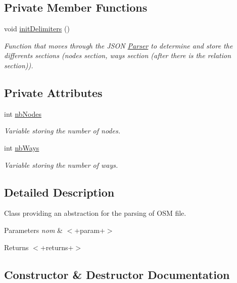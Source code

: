 \subsection*{Private Member Functions}
\begin{DoxyCompactItemize}
\item 
void \hyperlink{classParser_a43282c4f0874c45a64a6daf25cae6e31}{init\+Delimiters} ()
\begin{DoxyCompactList}\small\item\em Function that moves through the J\+S\+ON \hyperlink{classParser}{Parser} to determine and store the differents sections (nodes section, ways section (after there is the relation section)). \end{DoxyCompactList}\end{DoxyCompactItemize}
\subsection*{Private Attributes}
\begin{DoxyCompactItemize}
\item 
int \hyperlink{classParser_a0b9210ce3e141f6c36ee800e6301e477}{nb\+Nodes}
\begin{DoxyCompactList}\small\item\em Variable storing the number of nodes.\end{DoxyCompactList}\item 
int \hyperlink{classParser_a641ee642470f19ec1cb79b74f8c70288}{nb\+Ways}
\begin{DoxyCompactList}\small\item\em Variable storing the number of ways.\end{DoxyCompactList}\end{DoxyCompactItemize}


\subsection{Detailed Description}
Class providing an abstraction for the parsing of O\+SM file. 


\begin{DoxyParams}{Parameters}
{\em nom} & $<$+param+$>$\\
\hline
\end{DoxyParams}
\begin{DoxyReturn}{Returns}
$<$+returns+$>$
\end{DoxyReturn}


\subsection{Constructor \& Destructor Documentation}
\mbox{\label{classParser_afc8c6d06d662fe845cf2bc614107adba}} 
